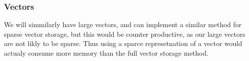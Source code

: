 \documentclass[../fem.tex]{subfiles}
\begin{document}
\subsubsection{Vectors}%
\label{ssub:vectors}

We will simmilarly have large vectors, and can implement a similar method for
sparse vector storage, but this would be counter productive, as our large
vectors are not likly to be sparse. Thus using a sparce represetnation of a
vector would actualy consume more memory than the full vector storage method.
\end{document}
